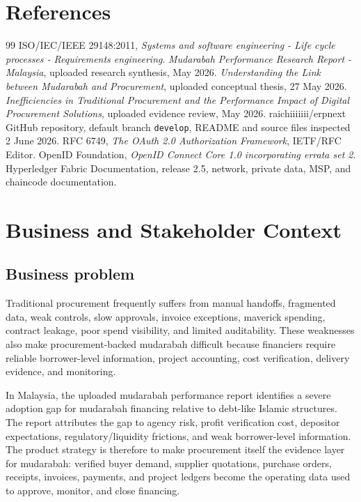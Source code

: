 \documentclass[11pt,a4paper]{article}
\newcommand{\code}[1]{\texttt{#1}}
\begin{document}
\section{References}
\begin{thebibliography}{99}
 ISO/IEC/IEEE 29148:2011, \textit{Systems and software engineering - Life cycle processes - Requirements engineering}.
 \textit{Mudarabah Performance Research Report - Malaysia}, uploaded research synthesis, May 2026.
 \textit{Understanding the Link between Mudarabah and Procurement}, uploaded conceptual thesis, 27 May 2026.
 \textit{Inefficiencies in Traditional Procurement and the Performance Impact of Digital Procurement Solutions}, uploaded evidence review, May 2026.
 raichiiiiiii/erpnext GitHub repository, default branch \code{develop}, README and source files inspected 2 June 2026.
 RFC 6749, \textit{The OAuth 2.0 Authorization Framework}, IETF/RFC Editor.
 OpenID Foundation, \textit{OpenID Connect Core 1.0 incorporating errata set 2}.
 Hyperledger Fabric Documentation, release 2.5, network, private data, MSP, and chaincode documentation.
\end{thebibliography}

\section{Business and Stakeholder Context}

\subsection{Business problem}
Traditional procurement frequently suffers from manual handoffs, fragmented data, weak controls, slow approvals, invoice exceptions, maverick spending, contract leakage, poor spend visibility, and limited auditability. These weaknesses also make procurement-backed mudarabah difficult because financiers require reliable borrower-level information, project accounting, cost verification, delivery evidence, and monitoring.

In Malaysia, the uploaded mudarabah performance report identifies a severe adoption gap for mudarabah financing relative to debt-like Islamic structures. The report attributes the gap to agency risk, profit verification cost, depositor expectations, regulatory/liquidity frictions, and weak borrower-level information. The product strategy is therefore to make procurement itself the evidence layer for mudarabah: verified buyer demand, supplier quotations, purchase orders, receipts, invoices, payments, and project ledgers become the operating data used to approve, monitor, and close financing.
\end{document}
